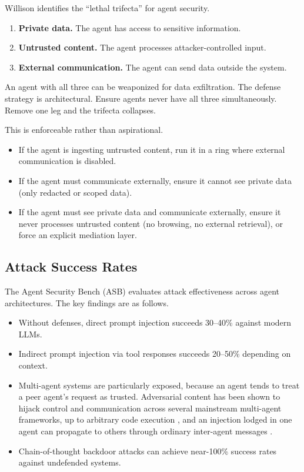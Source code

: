 Willison \cite{willison2025} identifies the ``lethal trifecta'' for agent security.
\begin{enumerate}
\item \textbf{Private data.} The agent has access to sensitive information.
\item \textbf{Untrusted content.} The agent processes attacker-controlled input.
\item \textbf{External communication.} The agent can send data outside the system.
\end{enumerate}

An agent with all three can be weaponized for data exfiltration. The defense strategy is architectural. Ensure agents never have all three simultaneously. Remove one leg and the trifecta collapses.

This is enforceable rather than aspirational.
\begin{itemize}
\item If the agent is ingesting untrusted content, run it in a ring where external communication is disabled.
\item If the agent must communicate externally, ensure it cannot see private data (only redacted or scoped data).
\item If the agent must see private data and communicate externally, ensure it never processes untrusted content (no browsing, no external retrieval), or force an explicit mediation layer.
\end{itemize}

\subsection{Attack Success Rates}

The Agent Security Bench (ASB) \cite{asb2025} evaluates attack effectiveness across agent architectures. The key findings are as follows.
\begin{itemize}
\item Without defenses, direct prompt injection succeeds 30--40\% against modern LLMs.
\item Indirect prompt injection via tool responses succeeds 20--50\% depending on context.
\item Multi-agent systems are particularly exposed, because an agent tends to treat a peer agent's request as trusted. Adversarial content has been shown to hijack control and communication across several mainstream multi-agent frameworks, up to arbitrary code execution \cite{maliciouscode2025}, and an injection lodged in one agent can propagate to others through ordinary inter-agent messages \cite{promptinfection2024}.
\item Chain-of-thought backdoor attacks can achieve near-100\% success rates against undefended systems.
\end{itemize}

